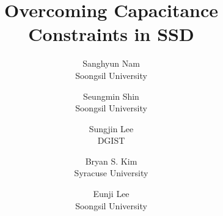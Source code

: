 \documentclass[letterpaper,twocolumn,10pt]{article}
\newcommand{\EUNJI}[1]{\textcolor{black}{#1}}
\newcommand{\ours}{\texttt{Dawid}}
\begin{document}
\date{}

\title{\Large \bf Overcoming Capacitance Constraints in SSD}
\author{
{\rm Sanghyun Nam}\\
Soongsil University
\and
{\rm Seungmin Shin}\\
Soongsil University
\and
{\rm Sungjin Lee}\\
DGIST
\and
{\rm Bryan S. Kim}\\
Syracuse University
\and
{\rm Eunji Lee}\\
Soongsil University
}
\maketitle

\thispagestyle{empty}

\end{document}
